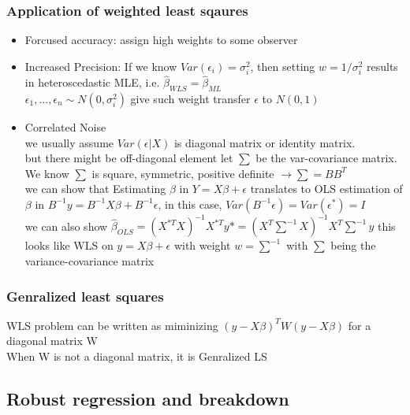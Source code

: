 \documentclass[10pt]{article}
\theoremstyle{break}
\begin{document}
        \subsubsection{Application of weighted least sqaures}
            \begin{itemize}
                \item Forcused accuracy: assign high weights to some observer
                \item Increased Precision: If we know $Var(\epsilon_i)=\sigma_i^2$, then setting
                    $w=1/\sigma_i^2$ results in heteroscedastic MLE, i.e. $\hat{\beta}_{WLS}=\hat{\beta}_{ML}$
                    \\$\epsilon_1, ..., \epsilon_n \sim N(0, \sigma_i^2)$ give such weight transfer $\epsilon$ to $N(0,1)$
                \item Correlated Noise\\
                    we usually assume $Var(\epsilon|X)$ is diagonal matrix or identity matrix. 
                    \\but there might be off-diagonal element
                    let $\sum$ be the var-covariance matrix. We know $\sum$ is square, symmetric, positive definite
                    $\rightarrow \sum = B B^T$ 
                    \\we can show that Estimating $\beta$ in $Y=X\beta + \epsilon$ translates to OLS estimation of 
                    $\beta$ in $B^{-1}y=B^{-1}X\beta+B^{-1}\epsilon$, in this case, $Var(B^{-1}\epsilon)=Var(\epsilon^*)=I$ 
                    \\we can also show $\hat{\beta}_{OLS}=(X^{*T}X)^{-1}X^{*T}y*=(X^T\sum^{-1}X)^{-1}X^T\sum^{-1}y$
                    this looks like WLS on $y=X\beta + \epsilon$ with weight $w=\sum^{-1}$ with $\sum$ being the variance-covariance matrix
            \end{itemize}
        \subsubsection{Genralized least squares}
            WLS problem can be written as miminizing $(y-X\beta)^TW(y-X\beta)$ for a diagonal matrix W
            \\When W is not a diagonal matrix, it is Genralized LS 
    \subsection{Robust regression and breakdown}
\end{document}
